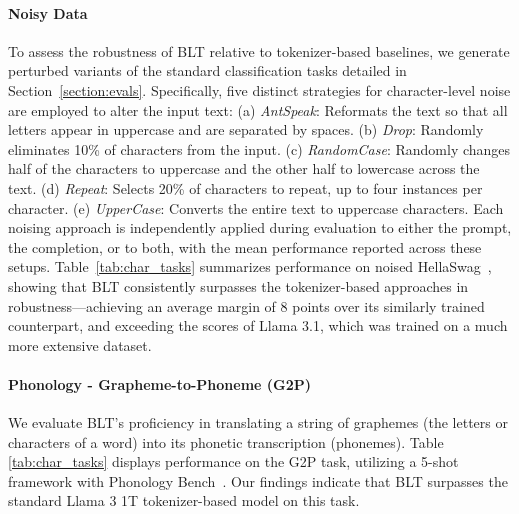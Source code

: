\paragraph{Noisy Data} To assess the robustness of {\textsc BLT} relative to tokenizer-based baselines, we generate perturbed variants of the standard classification tasks detailed in Section~\ref{section:evals}. Specifically, five distinct strategies for character-level noise are employed to alter the input text: (a) \textit{AntSpeak}: Reformats the text so that all letters appear in uppercase and are separated by spaces. (b) \textit{Drop}: Randomly eliminates 10\% of characters from the input. (c) \textit{RandomCase}: Randomly changes half of the characters to uppercase and the other half to lowercase across the text. (d) \textit{Repeat}: Selects 20\% of characters to repeat, up to four instances per character. (e) \textit{UpperCase}: Converts the entire text to uppercase characters. Each noising approach is independently applied during evaluation to either the prompt, the completion, or to both, with the mean performance reported across these setups. Table~\ref{tab:char_tasks} summarizes performance on noised HellaSwag~\citep{Eval_hellaswag}, showing that {\textsc BLT} consistently surpasses the tokenizer-based approaches in robustness—achieving an average margin of 8 points over its similarly trained counterpart, and exceeding the scores of Llama 3.1, which was trained on a much more extensive dataset.

\paragraph{Phonology - Grapheme-to-Phoneme (G2P)} We evaluate {\textsc BLT}'s proficiency in translating a string of graphemes (the letters or characters of a word) into its phonetic transcription (phonemes). Table \ref{tab:char_tasks} displays performance on the G2P task, utilizing a 5-shot framework with Phonology Bench~\citep{suvarna2024phonologybench}. Our findings indicate that {\textsc BLT} surpasses the standard Llama 3 1T tokenizer-based model on this task.

